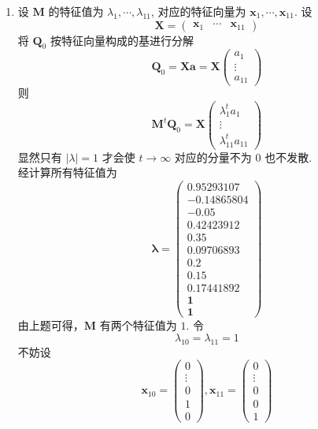 \documentclass[11pt,letter,notitlepage]{article}
\begin{document}
\begin{solution}
\begin{enumerate}
\begin{enumerate}
			      \item 设 $\mathbf{M}$ 的特征值为 $\lambda_1,\cdots,\lambda_{11}$, 对应的特征向量为 $\mathbf{x}_1,\cdots,\mathbf{x}_{11}$. 设
			            $$\mathbf{X}=\begin{pmatrix}
					            \mathbf{x}_1 & \cdots & \mathbf{x}_{11}
				            \end{pmatrix}$$
			            将 $\mathbf{Q}_0$ 按特征向量构成的基进行分解
			            $$\mathbf{Q}_0=\mathbf{X}\mathbf{a}=\mathbf{X}\begin{pmatrix}
					            a_1 \\ \vdots \\ a_{11}
				            \end{pmatrix}$$
			            则
			            $$\mathbf{M}^t \mathbf{Q}_0=\mathbf{X}\begin{pmatrix}
					            \lambda_1^t a_1 \\ \vdots \\ \lambda_{11}^t a_{11}
				            \end{pmatrix}$$
			            显然只有 $|\lambda|=1$ 才会使 $t\rightarrow\infty$ 对应的分量不为 $0$ 也不发散.\\
			            经计算所有特征值为 $$\mathbf{\lambda=\begin{pmatrix}
						            0.95293107 \\ -0.14865804\\ -0.05      \\0.42423912 \\
						            0.35       \\  0.09706893\\  0.2      \\  0.15      \\
						            0.17441892 \\1\\1
					            \end{pmatrix}}$$
			            由上题可得，$\mathbf{M}$ 有两个特征值为 $1$. 令
			            $$\lambda_{10}=\lambda_{11}=1$$
			            不妨设
			            $$\mathbf{x}_{10}=\begin{pmatrix}
					            0 \\ \vdots\\0\\1\\0
				            \end{pmatrix}, \mathbf{x}_{11}=\begin{pmatrix}
					            0 \\ \vdots\\0\\0\\1

\end{pmatrix}$$
\end{enumerate}
\end{enumerate}
\end{solution}
\end{document}
